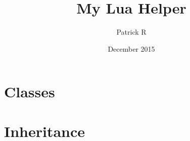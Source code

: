 \documentclass{article}
\title{My Lua Helper}
\author{Patrick R}
\date{December 2015}
\begin{document}
\maketitle

\section{Classes}


\section{Inheritance}

\end{document}
